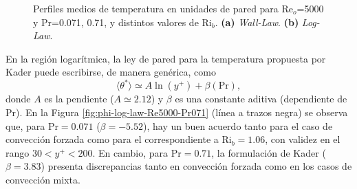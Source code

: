 \begin{figure}[H]
  \centering
    \caption{Perfiles medios de temperatura en unidades de pared para Re$_o$=5000 y Pr=0.071, 0.71, y distintos valores de Ri$_b$. \textbf{(a)} \textit{Wall-Law}. \textbf{(b)} \textit{Log-Law}.}
    \label{fig:phi-plus-Re5000-Pr071}
\end{figure}



En la región logarítmica, la ley de pared para la temperatura propuesta por Kader \cite{kader1981temperature} puede escribirse, de manera genérica, como
\begin{equation*}
\langle \theta^* \rangle \simeq A \ln(y^+) + \beta(\text{Pr}),
\end{equation*}
donde $A$ es la pendiente ($A \simeq 2\text{.}12$) y $\beta$ es una constante aditiva (dependiente de $\text{Pr}$). En la Figura \ref{fig:phi-log-law-Re5000-Pr071} (línea a trazos negra) se observa que, para $\text{Pr}=0\text{.}071$ ($\beta=-5\text{.}52$), hay un buen acuerdo tanto para el caso de convección forzada como para el correspondiente a $\text{Ri}_b=1\text{.}06$, con validez en el rango $30<y^+<200$. En cambio, para $\text{Pr}=0\text{.}71$, la formulación de Kader ($\beta=3\text{.}83$) presenta discrepancias tanto en convección forzada como en los casos de convección mixta.

